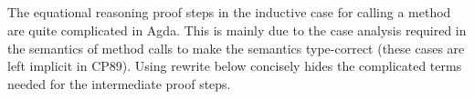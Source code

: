 \begin{AgdaAlign}
\begin{code}
\AgdaSpace{}%
\AgdaSpace{}%
\AgdaSpace{}%
\AgdaSymbol{=}\<%
\\
\>[4][@{}l@{\AgdaIndent{0}}]%
\>[6]%
\>[13]\AgdaSpace{}%
\AgdaSymbol{(}\AgdaSpace{}%
\AgdaSymbol{)}\AgdaSpace{}%
\AgdaSpace{}%
\AgdaSpace{}%
\AgdaSpace{}%
\AgdaSpace{}%
\AgdaSymbol{(}\AgdaSpace{}%
\AgdaSpace{}%
\AgdaSymbol{)}\<%
\\
%
\>[6]%
\>[13]\AgdaSymbol{(}\AgdaSpace{}%
\AgdaSpace{}%
\AgdaSpace{}%
\AgdaSpace{}%
\AgdaSpace{}%
\AgdaSpace{}%
\AgdaSymbol{)}\<%
\\
%
\>[6]%
\>[13]\AgdaSpace{}%
\AgdaSpace{}%
\AgdaSpace{}%
\AgdaSymbol{(}\AgdaSpace{}%
\AgdaSpace{}%
\AgdaSymbol{)}\AgdaSpace{}%
\AgdaSymbol{(}\AgdaSpace{}%
\AgdaSymbol{(}\AgdaSpace{}%
\AgdaSymbol{)}\AgdaSpace{}%
\AgdaSpace{}%
\AgdaSymbol{)}\<%
\\
%
\>[6]\<%
\end{code}
%
The equational reasoning proof steps in the inductive case for calling a method
are quite complicated in Agda.
This is mainly due to the case analysis required in the semantics of method calls
to make the semantics type-correct
(these cases are left implicit in CP89).
Using rewrite below concisely hides the complicated terms needed for the intermediate proof steps.
%
\begin{code}%
%
\>[4]\AgdaSpace{}%
\AgdaSpace{}%
\AgdaSymbol{(}\AgdaSpace{}%
\AgdaSpace{}%
\AgdaSpace{}%
\AgdaSymbol{)}\AgdaSpace{}%
\AgdaSpace{}%
\AgdaSpace{}%
\AgdaSpace{}%
\AgdaSpace{}%
\AgdaSymbol{(}\AgdaSpace{}%
\AgdaSpace{}%
\AgdaSpace{}%
\AgdaSpace{}%
\AgdaSpace{}%
\AgdaSymbol{)}\AgdaSpace{}%
\AgdaSpace{}%
\AgdaSymbol{(}\AgdaSpace{}%

\end{code}
\end{AgdaAlign}
